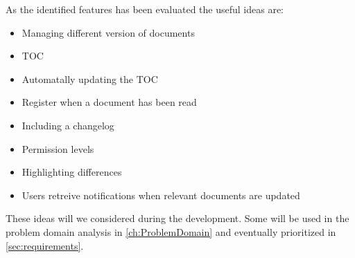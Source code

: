 As the identified features has been evaluated the useful ideas are:
\begin{itemize}
	\item Managing different version of documents
	\item TOC
	\item Automatally updating the TOC
	\item Register when a document has been read
	\item Including a changelog
	\item Permission levels
	\item Highlighting differences
	\item Users retreive notifications when relevant documents are updated
\end{itemize}

These ideas will we considered during the development.
Some will be used in the problem domain analysis in \cref{ch:ProblemDomain} and eventually prioritized in \cref{sec:requirements}.
